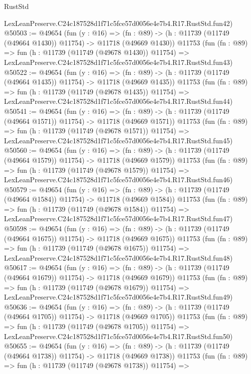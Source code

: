 \begin{lexlean}{RustStd}
\begin{coremodule}
    LexLeanPreserve.C24c187528d1f71c5fce57d0056e4e7b4.R17.RustStd.fun42)
@50503 := @49654
    (fun (y : @16) =>
    (fn : @89) -> (h : @11739 (@11749 (@49664 @1430)) @11754) -> @11718 (@49669 @1430))
    @11753
    (fun (fn : @89) =>
    fun (h : @11739 (@11749 (@49678 @1430)) @11754) =>
    LexLeanPreserve.C24c187528d1f71c5fce57d0056e4e7b4.R17.RustStd.fun43)
@50522 := @49654
    (fun (y : @16) =>
    (fn : @89) -> (h : @11739 (@11749 (@49664 @1435)) @11754) -> @11718 (@49669 @1435))
    @11753
    (fun (fn : @89) =>
    fun (h : @11739 (@11749 (@49678 @1435)) @11754) =>
    LexLeanPreserve.C24c187528d1f71c5fce57d0056e4e7b4.R17.RustStd.fun44)
@50541 := @49654
    (fun (y : @16) =>
    (fn : @89) -> (h : @11739 (@11749 (@49664 @1571)) @11754) -> @11718 (@49669 @1571))
    @11753
    (fun (fn : @89) =>
    fun (h : @11739 (@11749 (@49678 @1571)) @11754) =>
    LexLeanPreserve.C24c187528d1f71c5fce57d0056e4e7b4.R17.RustStd.fun45)
@50560 := @49654
    (fun (y : @16) =>
    (fn : @89) -> (h : @11739 (@11749 (@49664 @1579)) @11754) -> @11718 (@49669 @1579))
    @11753
    (fun (fn : @89) =>
    fun (h : @11739 (@11749 (@49678 @1579)) @11754) =>
    LexLeanPreserve.C24c187528d1f71c5fce57d0056e4e7b4.R17.RustStd.fun46)
@50579 := @49654
    (fun (y : @16) =>
    (fn : @89) -> (h : @11739 (@11749 (@49664 @1584)) @11754) -> @11718 (@49669 @1584))
    @11753
    (fun (fn : @89) =>
    fun (h : @11739 (@11749 (@49678 @1584)) @11754) =>
    LexLeanPreserve.C24c187528d1f71c5fce57d0056e4e7b4.R17.RustStd.fun47)
@50598 := @49654
    (fun (y : @16) =>
    (fn : @89) -> (h : @11739 (@11749 (@49664 @1675)) @11754) -> @11718 (@49669 @1675))
    @11753
    (fun (fn : @89) =>
    fun (h : @11739 (@11749 (@49678 @1675)) @11754) =>
    LexLeanPreserve.C24c187528d1f71c5fce57d0056e4e7b4.R17.RustStd.fun48)
@50617 := @49654
    (fun (y : @16) =>
    (fn : @89) -> (h : @11739 (@11749 (@49664 @1679)) @11754) -> @11718 (@49669 @1679))
    @11753
    (fun (fn : @89) =>
    fun (h : @11739 (@11749 (@49678 @1679)) @11754) =>
    LexLeanPreserve.C24c187528d1f71c5fce57d0056e4e7b4.R17.RustStd.fun49)
@50636 := @49654
    (fun (y : @16) =>
    (fn : @89) -> (h : @11739 (@11749 (@49664 @1705)) @11754) -> @11718 (@49669 @1705))
    @11753
    (fun (fn : @89) =>
    fun (h : @11739 (@11749 (@49678 @1705)) @11754) =>
    LexLeanPreserve.C24c187528d1f71c5fce57d0056e4e7b4.R17.RustStd.fun50)
@50655 := @49654
    (fun (y : @16) =>
    (fn : @89) -> (h : @11739 (@11749 (@49664 @1738)) @11754) -> @11718 (@49669 @1738))
    @11753
    (fun (fn : @89) =>
    fun (h : @11739 (@11749 (@49678 @1738)) @11754) =>

\end{coremodule}
\end{lexlean}
